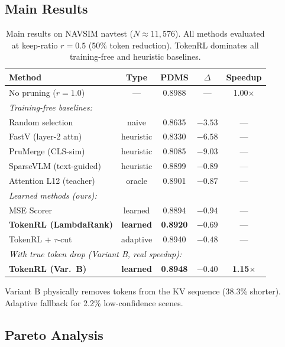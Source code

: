 \documentclass[letterpaper]{article} %
\newcommand{\ours}{TokenRL}
\begin{document}
\subsection{Main Results}

\begin{table}[t]
\centering
\caption{Main results on NAVSIM navtest ($N{\approx}11{,}576$). All methods evaluated at keep-ratio $r{=}0.5$ (50\% token reduction). \ours{} dominates all training-free and heuristic baselines.}
\label{tab:main}
\small
\begin{tabular}{lcccc}
\toprule
\textbf{Method} & \textbf{Type} & \textbf{PDMS} & \textbf{$\Delta$} & \textbf{Speedup} \\
\midrule
No pruning ($r{=}1.0$) & --- & 0.8988 & --- & 1.00$\times$ \\
\midrule
\multicolumn{5}{l}{\emph{Training-free baselines:}} \\
Random selection & naive & 0.8635 & $-3.53$ & --- \\
FastV (layer-2 attn) & heuristic & 0.8330 & $-6.58$ & --- \\
PruMerge (CLS-sim) & heuristic & 0.8085 & $-9.03$ & --- \\
SparseVLM (text-guided) & heuristic & 0.8899 & $-0.89$ & --- \\
Attention L12 (teacher) & oracle & 0.8901 & $-0.87$ & --- \\
\midrule
\multicolumn{5}{l}{\emph{Learned methods (ours):}} \\
MSE Scorer & learned & 0.8894 & $-0.94$ & --- \\
\textbf{\ours{} (LambdaRank)} & \textbf{learned} & \textbf{0.8920} & \textbf{$-0.69$} & --- \\
\ours{} + $\tau$-cut & adaptive & 0.8940 & $-0.48$ & --- \\
\midrule
\multicolumn{5}{l}{\emph{With true token drop (Variant B, real speedup):}} \\
\textbf{\ours{} (Var.\ B)} & \textbf{learned} & \textbf{0.8948} & \textbf{$-0.40$} & \textbf{1.15$\times$} \\
\bottomrule
\end{tabular}
\vspace{-1mm}
{\scriptsize Variant B physically removes tokens from the KV sequence (38.3\% shorter). Adaptive fallback for 2.2\% low-confidence scenes.}
\end{table}

\subsection{Pareto Analysis}
\end{document}
